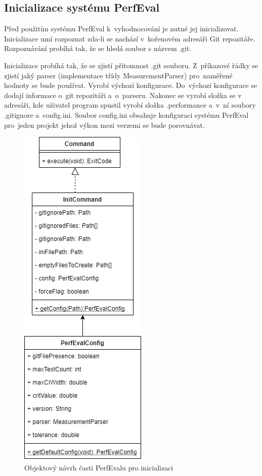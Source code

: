 \subsection{Inicializace systému PerfEval}

Před použitím systému PerfEval k~vyhodnocování je nutné jej inicializovat. Inicializace umí rozpoznat zda-li se nachází
v~kořenovém adresáři Git repozitáře. Rozpoznávání probíhá tak, že se hledá soubor s názvem .git.

Inicializace probíhá tak, že se zjistí přítomnost .git souboru. Z~příkazové řádky se zjistí jaký parser (implementace
třídy MeasurementParser) pro~naměřené hodnoty se bude používat. Vyrobí výchozí konfigurace. Do~výchozí konfigurace
se dodají informace o~git repozitáři a~o~parseru. Nakonec se vyrobí složka se v adresáři, kde uživatel program spustil
vyrobí složka .performance a~v~ní soubory .gitignore a~config.ini. Soubor config.ini obsahuje konfiguraci systému PerfEval
pro~jeden projekt jehož výkon mezi verzemi se bude porovnávat.

\begin{figure}[h!]
    \centering
    \includegraphics[height=0.5\textheight]{../img/perfeval_init.png}
    \caption{Objektový návrh časti PerfEvalu pro inicializaci}
\end{figure}

